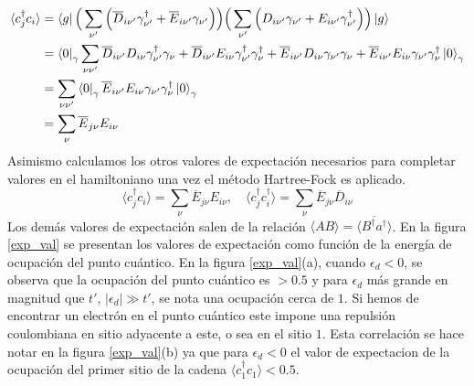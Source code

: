 \begin{equation}
\begin{split}
             \langle c_j^\dagger c_i \rangle &= \bra{g}\Big( \sum_{\nu'}\Big( \overline{D}_{i\nu'}\gamma^\dagger_{\nu'}+\overline{E}_{i\nu'}\gamma_{\nu'} \Big) \Big)\Big( \sum_{\nu'}\Big( D_{i\nu'}\gamma_{\nu'}+E_{i\nu'}\gamma^\dagger_{\nu'} \Big) \Big) \ket{g}\\
             &= \bra{0}_\gamma\sum_{\nu\nu'} \overline{D}_{i\nu'} D_{i\nu} \gamma_{\nu'}^\dagger\gamma_\nu + \overline{D}_{i\nu'}E_{i\nu}\gamma^\dagger_{\nu'}\gamma^\dagger_\nu + \overline{E}_{i\nu'}D_{i\nu}\gamma_{\nu'}\gamma_\nu+\overline{E}_{i\nu'}E_{i\nu} \gamma_{\nu'}\gamma^\dagger_\nu \ket{0}_\gamma\\
             &=\sum_{\nu\nu'} \bra{0}_\gamma \overline{E}_{i\nu'} E_{i\nu} \gamma_{\nu'}\gamma^\dagger_\nu\ket{0}_\gamma \\
             &=\sum_\nu \overline{E}_{j\nu} E_{i\nu}
\end{split}
\end{equation}
Asimismo calculamos los otros valores de expectaci\'{o}n necesarios para completar valores en el hamiltoniano una vez el m\'{e}todo Hartree-Fock es aplicado.
\begin{equation}
    \langle c_j^\dagger c_i \rangle = \sum_\nu \overline{E}_{j\nu} E_{i\nu}, \quad \langle c_j^\dagger c_i^\dagger\rangle = \sum_\nu 
 \overline{E}_{j\nu} \overline{D}_{i\nu}
\end{equation}
Los dem\'{a}s valores de expectaci\'{o}n salen de la relaci\'{o}n $\langle AB\rangle= \overline{\langle B^\dagger a^\dagger \rangle}$. En la figura \ref{exp_val} se presentan los valores de expectaci\'{o}n como funci\'{o}n de la energ\'{i}a de ocupaci\'{o}n del punto cu\'{a}ntico. En la figura \ref{exp_val}(a), cuando $\epsilon_d<0$, se observa que la ocupaci\'{o}n del punto cu\'{a}ntico es $>0.5$ y para $\epsilon_d$ m\'{a}s grande en magnitud que $t'$, $|\epsilon_d|\gg t'$, se nota una ocupaci\'{o}n cerca de $1$. Si hemos de encontrar un electr\'{o}n en el punto cu\'{a}ntico este impone una repulsi\'{o}n coulombiana en sitio adyacente a este, o sea en el sitio $1$. Esta correlaci\'{o}n se hace notar en la figura \ref{exp_val}(b) ya que para $\epsilon_d<0$ el valor de expectacion de la ocupaci\'{o}n del primer sitio de la cadena $\langle c^\dagger_1 c_1 \rangle<0.5$. 

